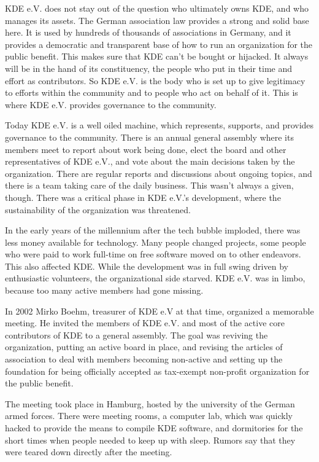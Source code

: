 KDE e.V. does not stay out of the question who ultimately owns KDE, and who manages its assets. The German association law provides a strong and solid base here. It is used by hundreds of thousands of associations in Germany, and it provides a democratic and transparent base of how to run an organization for the public benefit. This makes sure that KDE can't be bought or hijacked. It always will be in the hand of its constituency, the people who put in their time and effort as contributors. So KDE e.V. is the body who is set up to give legitimacy to efforts within the community and to people who act on behalf of it. This is where KDE e.V. provides governance to the community.

Today KDE e.V. is a well oiled machine, which represents, supports, and provides governance to the community. There is an annual general assembly where its members meet to report about work being done, elect the board and other representatives of KDE e.V., and vote about the main decisions taken by the organization. There are regular reports and discussions about ongoing topics, and there is a team taking care of the daily business. This wasn't always a given, though. There was a critical phase in KDE e.V.'s development, where the sustainability of the organization was threatened.

In the early years of the millennium after the tech bubble imploded, there was less money available for technology. Many people changed projects, some people who were paid to work full-time on free software moved on to other endeavors. This also affected KDE. While the development was in full swing driven by enthusiastic volunteers, the organizational side starved. KDE e.V. was in limbo, because too many active members had gone missing.

In 2002 Mirko Boehm, treasurer of KDE e.V at that time, organized a memorable meeting. He invited the members of KDE e.V. and most of the active core contributors of KDE to a general assembly. The goal was reviving the organization, putting an active board in place, and revising the articles of association to deal with members becoming non-active and setting up the foundation for being officially accepted as tax-exempt non-profit organization for the public benefit.

The meeting took place in Hamburg, hosted by the university of the German armed forces. There were meeting rooms, a computer lab, which was quickly hacked to provide the means to compile KDE software, and dormitories for the short times when people needed to keep up with sleep. Rumors say that they were teared down directly after the meeting.

